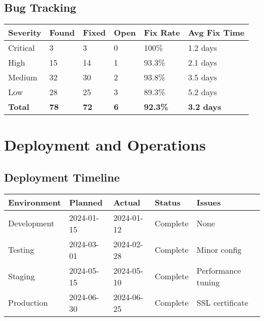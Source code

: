 \documentclass[12pt,a4paper]{article}
\begin{document}
\subsection{Bug Tracking}
\begin{longtable}{|p{3cm}|p{2cm}|p{2cm}|p{2cm}|p{2cm}|p{3cm}|}
\hline
\rowcolor{lightgray}
\textbf{Severity} & \textbf{Found} & \textbf{Fixed} & \textbf{Open} & \textbf{Fix Rate} & \textbf{Avg Fix Time} \\
\hline
Critical & 3 & 3 & 0 & 100\% & 1.2 days \\
\hline
High & 15 & 14 & 1 & 93.3\% & 2.1 days \\
\hline
Medium & 32 & 30 & 2 & 93.8\% & 3.5 days \\
\hline
Low & 28 & 25 & 3 & 89.3\% & 5.2 days \\
\hline
\textbf{Total} & \textbf{78} & \textbf{72} & \textbf{6} & \textbf{92.3\%} & \textbf{3.2 days} \\
\hline
\end{longtable}

\section{Deployment and Operations}

\subsection{Deployment Timeline}
\begin{longtable}{|p{3cm}|p{3cm}|p{3cm}|p{3cm}|p{3cm}|}
\hline
\rowcolor{lightgray}
\textbf{Environment} & \textbf{Planned} & \textbf{Actual} & \textbf{Status} & \textbf{Issues} \\
\hline
Development & 2024-01-15 & 2024-01-12 & \cellcolor{completedgreen}Complete & None \\
\hline
Testing & 2024-03-01 & 2024-02-28 & \cellcolor{completedgreen}Complete & Minor config \\
\hline
Staging & 2024-05-15 & 2024-05-10 & \cellcolor{completedgreen}Complete & Performance tuning \\
\hline
Production & 2024-06-30 & 2024-06-25 & \cellcolor{completedgreen}Complete & SSL certificate \\
\hline
\end{longtable}
\end{document}
